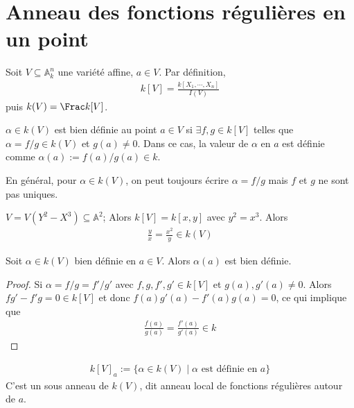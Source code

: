     \section{Anneau des fonctions régulières en un point}
        Soit $V \subseteq \mathbb{A}^n_k$ une variété affine, $a \in V$. Par définition,
        \begin{align*}
            k[V] = \frac{k[X_1, \cdots, X_n]}{I(V)}
        \end{align*}
        puis $k(V) = \Frac k[V]$.
        \begin{defi}
            $\alpha \in k(V)$ est bien définie au point $a \in V$ si $\exists f,g \in k[V]$ telles que $\alpha = f/g \in k(V)$ et $g(a) \neq 0$. Dans ce cas, la valeur de $\alpha$ en $a$ est définie comme $\alpha(a) := f(a)/g(a) \in k$.
        \end{defi}
        \begin{remq}
            En général, pour $\alpha \in k(V)$, on peut toujours écrire $\alpha = f/g$ mais $f$ et $g$ ne sont pas uniques.
        \end{remq}
        \begin{expl}
            $V = V(Y^2 - X^3) \subseteq \mathbb{A}^2$; Alors $k[V] = k[x,y]$ avec $y^2 = x^3$. Alors 
            \begin{align*}
                \frac yx = \frac{x^2}y \in k(V)
            \end{align*}
        \end{expl}
        \begin{prop}
            Soit $\alpha \in k(V)$ bien définie en $a \in V$. Alors $\alpha(a)$ est bien définie.
        \end{prop}
        \begin{proof}
            Si $\alpha = f/g = f'/g'$ avec $f,g,f',g' \in k[V]$ et $g(a), g'(a) \neq 0$. Alors $fg' - f'g = 0 \in k[V]$ et donc $f(a)g'(a) - f'(a)g(a) = 0$, ce qui implique que
            \begin{align*}
                \frac{f(a)}{g(a)} = \frac{f'(a)}{g'(a)} \in k
            \end{align*}
        \end{proof}
        \begin{nota}
            \begin{align*}
                k[V]_a := \{\alpha \in k(V) \mid \alpha \text{ est définie en } a \}
            \end{align*}
            C'est un sous anneau de $k(V)$, dit anneau local de fonctions régulières autour de $a$.
        \end{nota}
